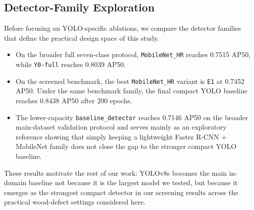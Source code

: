 \subsection{Detector-Family Exploration}
\label{sec:family-results}

Before focusing on YOLO-specific ablations, we compare the detector families that define the practical design space of this study.

\begin{itemize}[leftmargin=1.5em]
  \item On the broader full seven-class protocol, \texttt{MobileNet\_HR} reaches 0.7515 AP50, while \texttt{Y0-full} reaches 0.8039 AP50.
  \item On the screened benchmark, the best \texttt{MobileNet\_HR} variant is \texttt{E1} at 0.7452 AP50. Under the same benchmark family, the final compact YOLO baseline reaches 0.8438 AP50 after 200 epochs.
  \item The lower-capacity \texttt{baseline\_detector} reaches 0.7146 AP50 on the broader main-dataset validation protocol and serves mainly as an exploratory reference showing that simply keeping a lightweight Faster R-CNN + MobileNet family does not close the gap to the stronger compact YOLO baseline.
\end{itemize}

These results motivate the rest of our work: YOLOv8s becomes the main in-domain baseline not because it is the largest model we tested, but because it emerges as the strongest compact detector in our screening results across the practical wood-defect settings considered here.

